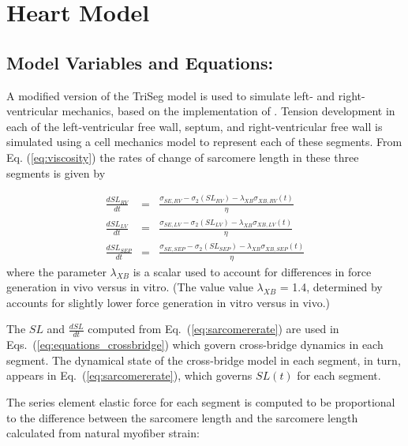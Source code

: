 \documentclass[fleqn,10pt]{physiome}
\begin{document}
\section{Heart Model}\label{sec:HeartModel}

\subsection{Model Variables and Equations:}

A modified version of the \cite{Lumens2009} TriSeg model is used to simulate left- and right-ventricular mechanics, based on the implementation of \cite{Tewari2016b}. Tension development in each of the left-ventricular free wall, septum, and right-ventricular free wall is simulated using a cell mechanics model to represent each of these segments. From Eq. (\ref{eq:viscosity}) the rates of change of sarcomere length in these three segments is given by

\begin{eqnarray}\label{eq:sarcomererate}
\frac{dSL_{RV}}{dt} &=& \frac{\sigma_{SE,RV} - \sigma_{2}(SL_{RV}) - \lambda_{XB}\sigma_{XB,RV}(t)}{\eta}     \nonumber \\
\frac{dSL_{LV}}{dt} &=& \frac{\sigma_{SE,LV} - \sigma_{2}(SL_{LV}) - \lambda_{XB}\sigma_{XB,LV}(t)}{\eta}     \nonumber \\
\frac{dSL_{SEP}}{dt} &=& \frac{\sigma_{SE,SEP} - \sigma_{2}(SL_{SEP}) - \lambda_{XB}\sigma_{XB,SEP}(t)}{\eta}
\end{eqnarray}
where the parameter $\lambda_{XB}$ is a scalar used to account for differences in force generation in vivo versus in vitro. (The value value $\lambda_{XB}$ = 1.4, determined by \cite{Tewari2016b} accounts for slightly lower force generation in vitro versus in vivo.)

The $SL$ and $\frac{dSL}{dt}$ computed from Eq.~(\ref{eq:sarcomererate}) are used in Eqs.~(\ref{eq:equations_crossbridge}) which govern cross-bridge dynamics in each segment. The dynamical state of the cross-bridge model in each segment, in turn, appears in Eq.~(\ref{eq:sarcomererate}), which governs $SL(t)$ for each segment.

The series element elastic force for each segment is computed to be proportional to the difference between the sarcomere length and the sarcomere length calculated from natural myofiber strain:
\end{document}
